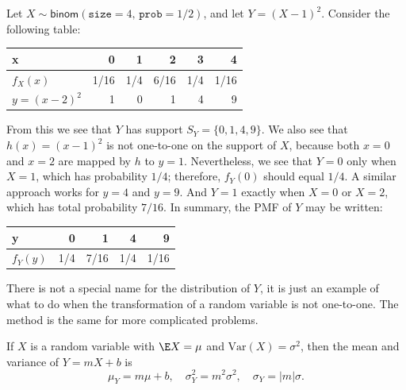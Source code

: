 \documentclass[captions=tableheading]{scrbook}
\begin{document}
\begin{example}
Let \(X\sim\mathsf{binom}(\mathtt{size}=4,\,\mathtt{prob}=1/2)\), and let \(Y=(X-1)^{2}\). Consider the following table:

\begin{center}
\begin{tabular}{lrrrrr}
 x                &     0  &    1  &     2  &    3  &     4  \\
\hline
 \(f_{X}(x)\)     &  1/16  &  1/4  &  6/16  &  1/4  &  1/16  \\
\hline
 \(y=(x-2)^{2}\)  &     1  &    0  &     1  &    4  &     9  \\
\end{tabular}
\end{center}


From this we see that \(Y\) has support \(S_{Y}=\{0,1,4,9\}\). We also see that \(h(x)=(x-1)^{2}\) is not one-to-one on the support of \(X\), because both \(x=0\) and \(x=2\) are mapped by \(h\) to \(y=1\). Nevertheless, we see that \(Y=0\) only when \(X=1\), which has probability \(1/4\); therefore, \(f_{Y}(0)\) should equal \(1/4\). A similar approach works for \(y=4\) and \(y=9\). And \(Y=1\) exactly when \(X=0\) or \(X=2\), which has total probability \(7/16\). In summary, the PMF of \(Y\) may be written:

\begin{center}
\begin{tabular}{lrrrr}
 y             &    0  &     1  &    4  &     9  \\
\hline
 \(f_{Y}(y)\)  &  1/4  &  7/16  &  1/4  &  1/16  \\
\end{tabular}
\end{center}


There is not a special name for the distribution of \(Y\), it is just an example of what to do when the transformation of a random variable is not one-to-one. The method is the same for more complicated problems.
\end{example}

\begin{prop}
If \(X\) is a random variable with \(\E X=\mu\) and \(\mbox{Var}(X)=\sigma^{2}\), then the mean and variance of \(Y=mX+b\) is
\begin{equation}
\mu_{Y}=m\mu+b,\quad\sigma_{Y}^{2}=m^{2}\sigma^{2},\quad\sigma_{Y}=|m|\sigma.
\end{equation}
\end{prop}

\newpage{}
\end{document}

